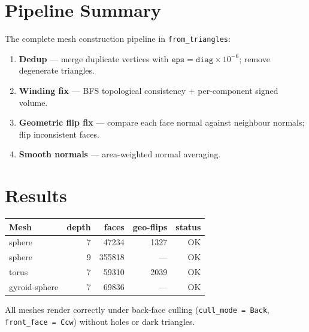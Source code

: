 \documentclass[11pt]{article}
\begin{document}
\section{Pipeline Summary}

The complete mesh construction pipeline in \texttt{from\_triangles}:

\begin{enumerate}
  \item \textbf{Dedup} --- merge duplicate vertices with
        $\texttt{eps} = \texttt{diag} \times 10^{-6}$; remove
        degenerate triangles.
  \item \textbf{Winding fix} --- BFS topological consistency +
        per-component signed volume.
  \item \textbf{Geometric flip fix} --- compare each face normal
        against neighbour normals; flip inconsistent faces.
  \item \textbf{Smooth normals} --- area-weighted normal averaging.
\end{enumerate}

\section{Results}

\begin{center}
\begin{tabular}{lrrrr}
\toprule
Mesh & depth & faces & geo-flips & status \\
\midrule
sphere       & 7 & 47234  & 1327 & OK \\
sphere       & 9 & 355818 & ---  & OK \\
torus        & 7 & 59310  & 2039 & OK \\
gyroid-sphere & 7 & 69836 & ---  & OK \\
\bottomrule
\end{tabular}
\end{center}

All meshes render correctly under back-face culling
(\texttt{cull\_mode = Back}, \texttt{front\_face = Ccw}) without
holes or dark triangles.
\end{document}
